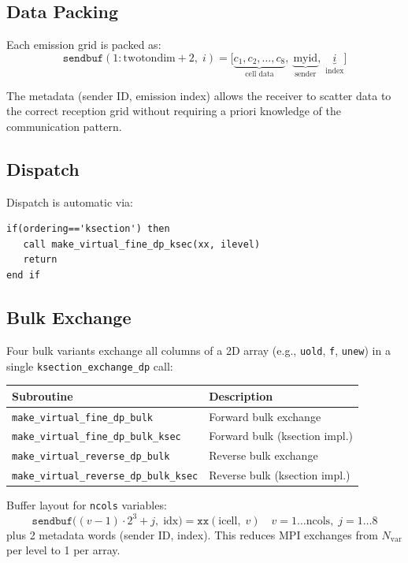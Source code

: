 \documentclass[11pt,fleqn]{book}
\begin{document}
\subsection{Data Packing}

Each emission grid is packed as:
\[
\texttt{sendbuf}(1{:}\text{twotondim}+2,\; i) = \bigl[\underbrace{c_1, c_2, \ldots, c_8}_{\text{cell data}},\; \underbrace{\text{myid}}_{\text{sender}},\; \underbrace{i}_{\text{index}}\bigr]
\]

The metadata (sender ID, emission index) allows the receiver to scatter data to the correct reception grid without requiring a priori knowledge of the communication pattern.

\subsection{Dispatch}

Dispatch is automatic via:
\begin{lstlisting}[style=fortran,numbers=none]
if(ordering=='ksection') then
   call make_virtual_fine_dp_ksec(xx, ilevel)
   return
end if
\end{lstlisting}

\subsection{Bulk Exchange}

Four bulk variants exchange all columns of a 2D array (e.g., \texttt{uold}, \texttt{f}, \texttt{unew}) in a single \texttt{ksection\_exchange\_dp} call:

\begin{center}
\begin{tabular}{ll}
\toprule
\textbf{Subroutine} & \textbf{Description} \\
\midrule
\texttt{make\_virtual\_fine\_dp\_bulk} & Forward bulk exchange \\
\texttt{make\_virtual\_fine\_dp\_bulk\_ksec} & Forward bulk (ksection impl.) \\
\texttt{make\_virtual\_reverse\_dp\_bulk} & Reverse bulk exchange \\
\texttt{make\_virtual\_reverse\_dp\_bulk\_ksec} & Reverse bulk (ksection impl.) \\
\bottomrule
\end{tabular}
\end{center}

Buffer layout for \texttt{ncols} variables:
\[
\texttt{sendbuf}\bigl((v{-}1) \cdot 2^{3} + j,\;\text{idx}\bigr) = \texttt{xx}(\text{icell},\; v) \quad v=1{\ldots}\text{ncols},\; j=1{\ldots}8
\]
plus 2 metadata words (sender ID, index). This reduces MPI exchanges from $N_{\text{var}}$ per level to 1 per array.
\end{document}
